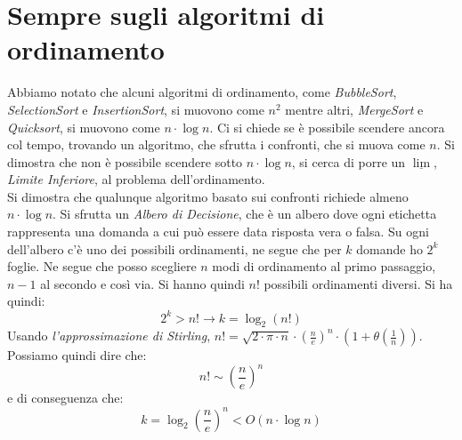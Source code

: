 \documentclass[a4paper,12pt,oneside,tikz]{book}
\begin{document}
\section{Sempre sugli algoritmi di ordinamento}
Abbiamo notato che alcuni algoritmi di ordinamento, come \textit{BubbleSort}, \textit{SelectionSort} e \textit{InsertionSort}, si muovono come $n^2$ mentre altri, \textit{MergeSort} e \textit{Quicksort}, si muovono come $n\cdot \log n$. Ci si chiede se è possibile scendere ancora col tempo, trovando un algoritmo, che sfrutta i confronti, che si muova come $n$. Si dimostra che non è possibile scendere sotto $n\cdot \log n$, si cerca di porre un $\underline{\lim}$, \textit{Limite Inferiore}, al problema dell'ordinamento. \\
Si dimostra che qualunque algoritmo basato sui confronti richiede almeno $n\cdot\log n$. Si sfrutta un \textit{Albero di Decisione}, che è un albero dove ogni etichetta rappresenta una domanda a cui può essere data risposta vera o falsa. 
Su ogni dell'albero c'è uno dei possibili ordinamenti, ne segue che per $k$ domande ho $2^k$ foglie. Ne segue che posso scegliere $n$ modi di ordinamento al primo passaggio, $n-1$ al secondo e così via. Si hanno quindi $n!$ possibili ordinamenti diversi. Si ha quindi:
$$2^k>n!\longrightarrow k=\log_2 (n!)$$  
Usando \textit{l'approssimazione di Stirling}, $n!=\sqrt{2\cdot \pi\cdot n}\cdot \left(\frac{n}{e}\right)^n\cdot\left(1+\theta\left(\frac{1}{n}\right)\right)$. \\Possiamo quindi dire che:
$$n!\sim \left(\frac{n}{e}\right)^n$$
e di conseguenza che:
$$k=\log_2\left(\frac{n}{e}\right)^n<O(n\cdot \log n)$$
\end{document}
